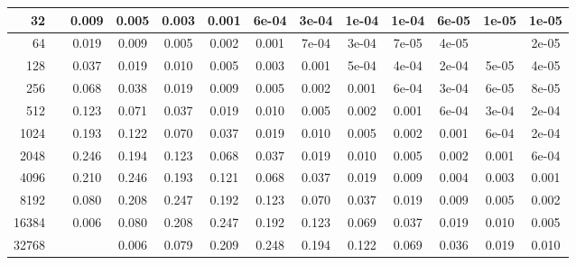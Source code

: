 \begin{appendices}
\begin{table}[H]
{\begin{tabular}{r|cccccccccccc}
32 &&0.009 &0.005 &0.003 &0.001 &6e-04 &3e-04 &1e-04 &1e-04 &6e-05 &1e-05 &1e-05\\\hline

64 &&0.019 &0.009 &0.005 &0.002 &0.001 &7e-04 &3e-04 &7e-05 &4e-05 &&2e-05\\\hline

128 &&0.037 &0.019 &0.010 &0.005 &0.003 &0.001 &5e-04 &4e-04 &2e-04 &5e-05 &4e-05\\\hline

256 &&0.068 &0.038 &0.019 &0.009 &0.005 &0.002 &0.001 &6e-04 &3e-04 &6e-05 &8e-05\\\hline

512 &&0.123 &0.071 &0.037 &0.019 &0.010 &0.005 &0.002 &0.001 &6e-04 &3e-04 &2e-04\\\hline

1024 &&0.193 &0.122 &0.070 &0.037 &0.019 &0.010 &0.005 &0.002 &0.001 &6e-04 &2e-04\\\hline

2048 &&0.246 &0.194 &0.123 &0.068 &0.037 &0.019 &0.010 &0.005 &0.002 &0.001 &6e-04\\\hline

4096 &&0.210 &0.246 &0.193 &0.121 &0.068 &0.037 &0.019 &0.009 &0.004 &0.003 &0.001\\\hline

8192 &&0.080 &0.208 &0.247 &0.192 &0.123 &0.070 &0.037 &0.019 &0.009 &0.005 &0.002\\\hline

16384 &&0.006 &0.080 &0.208 &0.247 &0.192 &0.123 &0.069 &0.037 &0.019 &0.010 &0.005\\\hline

32768 &&&0.006 &0.079 &0.209 &0.248 &0.194 &0.122 &0.069 &0.036 &0.019 &0.010\\\hline

\end{tabular}
}

\end{table}
\begin{table}[H]\ContinuedFloat
\caption[]{Experimentally computed CBT Estimate Distributon. Table 3/3}
\end{table}
\end{appendices}
